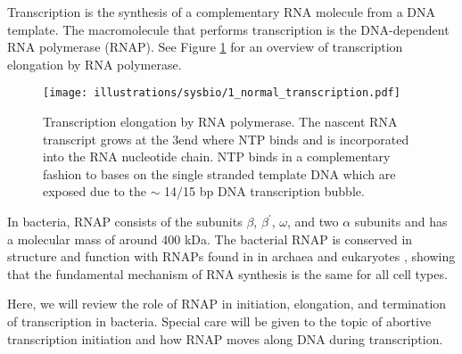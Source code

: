 %
Transcription is the synthesis of a complementary RNA molecule from a DNA
template. The macromolecule that performs transcription is the DNA-dependent
RNA polymerase (RNAP). See Figure \ref{fig:transcription_elongation} for an
overview of transcription elongation by RNA polymerase.

\begin{figure}[htb]
    \begin{center}
        \texttt{[image: illustrations/sysbio/1\_normal\_transcription.pdf]}
    \end{center}
    \caption{Transcription elongation by RNA polymerase. The nascent RNA
    transcript grows at the 3\protect\ppp end where NTP binds and is
    incorporated into the RNA nucleotide chain. NTP binds in a complementary
    fashion to bases on the single stranded template DNA which are exposed due
    to the $\sim$ 14/15 bp DNA transcription bubble.}
    \label{fig:transcription_elongation}
\end{figure}

In bacteria, RNAP consists of the subunits $\beta$, $\beta^{\prime}$, $\omega$,
and two $\alpha$ subunits and has a molecular mass of around 400 kDa. The
bacterial RNAP is conserved in structure and function with RNAPs found in in
archaea and eukaryotes \cite{borukhov_rna_2008}, showing that the fundamental
mechanism of RNA synthesis is the same for all cell types.

Here, we will review the role of RNAP in initiation, elongation, and
termination of transcription in bacteria. Special care will be given to the
topic of abortive transcription initiation and how RNAP moves along DNA during
transcription.


